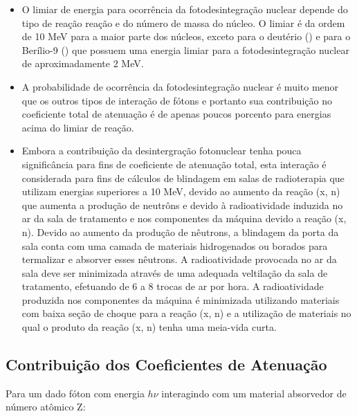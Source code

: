 \documentclass[11pt,a4paper]{article}
\begin{document}
    \begin{itemize}
		\item O limiar de energia para ocorrência da fotodesintegração nuclear depende do tipo de reação reação e do número de massa do núcleo. O limiar é da ordem de 10 MeV para a maior parte dos núcleos, exceto para o deutério () e para o Berílio-9 () que possuem uma energia limiar para a fotodesintegração nuclear de aproximadamente 2 MeV.
		
		\item A probabilidade de ocorrência da fotodesintegração nuclear é muito menor que os outros tipos de interação de fótons e portanto sua contribuição no coeficiente total de atenuação é de apenas poucos porcento para energias acima do limiar de reação. 
		
		\item Embora a contribuição da desintergração fotonuclear tenha pouca significância para fins de coeficiente de atenuação total, esta interação é considerada para fins de cálculos de blindagem em salas de radioterapia que utilizam energias superiores a 10 MeV, devido ao aumento da reação (x, n) que aumenta a produção de neutrôns e devido à radioatividade induzida no ar da sala de tratamento e nos componentes da máquina devido a reação (x, n). Devido ao aumento da produção de nêutrons, a blindagem da porta da sala conta com uma camada de materiais hidrogenados ou borados para termalizar e absorver esses nêutrons. A radioatividade provocada no ar da sala deve ser minimizada através de uma adequada veltilação da sala de tratamento, efetuando de 6 a 8 trocas de ar por hora.  A radioatividade produzida nos componentes da máquina é minimizada utilizando materiais com baixa seção de choque para a reação (x, n) e a utilização de materiais no qual o produto da reação (x, n) tenha uma meia-vida curta.
	\end{itemize}

\subsection*{Contribuição dos Coeficientes de Atenuação}

    Para um dado fóton com energia $h\nu$ interagindo com um material absorvedor de número atômico Z:
\end{document}
